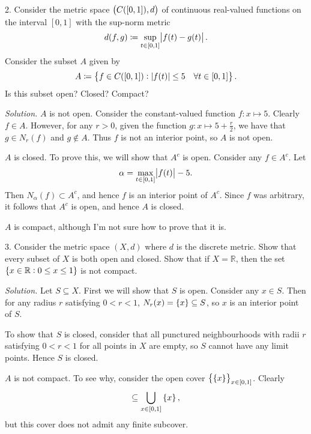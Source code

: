 \documentclass{article}
\newcommand{\R}{\mathbb{R}}
\begin{document}
\newpage

2. Consider the metric space $\del{C([0, 1]), d}$ of continuous real-valued
   functions on the interval $[0, 1]$ with the sup-norm metric
%
\begin{equation*}
    d(f, g) \coloneqq \sup_{t \in [0, 1]} \envert{f(t) - g(t)}
    .
\end{equation*}
%
Consider the subset $A$ given by
%
\begin{equation*}
    A \coloneqq \cbr{f \in C([0, 1]): |f(t)| \leq 5 \quad \forall t \in [0, 1]}
    .
\end{equation*}
%
Is this subset open? Closed? Compact?

\textit{Solution.}
$A$ is not open. Consider the constant-valued function $f: x \mapsto 5$.
Clearly $f \in A$. However, for any $r > 0$, given the function $g: x
\mapsto 5 + \frac{r}{2}$, we have that $g \in N_r(f)$ and $g \not\in A$.
Thus $f$ is not an interior point, so $A$ is not open.

$A$ is closed. To prove this, we will show that $A^c$ is open. Consider
any $f \in A^c$. Let
%
\begin{equation*}
    \alpha = \max_{t \in [0, 1]}\envert{f(t)} - 5
    .
\end{equation*}
%
Then $N_\alpha (f) \subset A^c$, and hence $f$ is an interior point
of $A^c$. Since $f$ was arbitrary, it follows that $A^c$ is open, and
hence $A$ is closed.

$A$ is compact, although I'm not sure how to prove that it is.

\newpage

3. Consider the metric space $(X, d)$ where $d$ is the discrete metric.
   Show that every subset of $X$ is both open and closed. Show that if
   $X = \R$, then the set $\cbr{x \in \R: 0 \leq x \leq 1}$ is not
   compact.

\textit{Solution.}
Let $S \subseteq X$. First we will show that $S$ is open. Consider any
$x \in S$. Then for any radius $r$ satisfying $0 < r < 1$, $N_r(x) =
\cbr{x} \subseteq S$, so $x$ is an interior point of $S$.

To show that $S$ is closed, consider that all punctured neighbourhoods
with radii $r$ satisfying $0 < r < 1$ for all points in $X$ are empty,
so $S$ cannot have any limit points. Hence $S$ is closed.

$A$ is not compact. To see why, consider the open cover
$\cbr{\cbr{x}}_{x \in [0, 1]}$. Clearly
%
\begin{equation*}
    [0, 1] \subseteq \bigcup_{x \in [0, 1]} \cbr{x}
    ,
\end{equation*}
%
but this cover does not admit any finite subcover.
\end{document}
